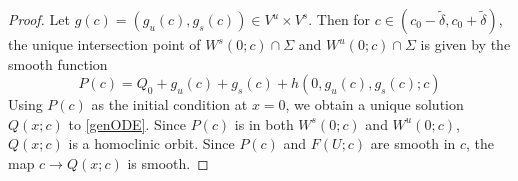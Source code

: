 \documentclass[thesis.tex]{subfiles}
\begin{document}
\begin{lemma}
\begin{proof}
Let $g(c) = (g_u(c), g_s(c)) \in V^u \times V^s$. Then for $c \in (c_0 - \tilde{\delta}, c_0 + \tilde{\delta})$, the unique intersection point of $W^s(0; c) \cap \Sigma$ and $W^u(0; c) \cap \Sigma$ is given by the smooth function
\[
P(c) = Q_0 + g_u(c) + g_s(c) + h(0, g_u(c), g_s(c); c)
\]
Using $P(c)$ as the initial condition at $x = 0$, we obtain a unique solution $Q(x; c)$ to \eqref{genODE}. Since $P(c)$ is in both $W^s(0; c)$ and $W^u(0; c)$, $Q(x; c)$ is a homoclinic orbit. Since $P(c)$ and $F(U; c)$ are smooth in $c$, the map $c \rightarrow Q(x; c)$ is smooth.
\end{proof}
\end{lemma}



\iffulldocument\else
	
	
\fi
\end{document}
